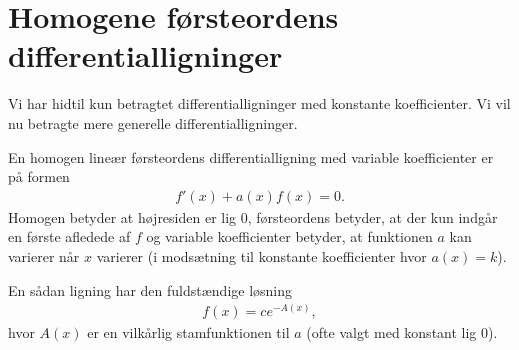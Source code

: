 \section{Homogene førsteordens differentialligninger}
\noindent Vi har hidtil kun betragtet differentialligninger med konstante koefficienter. Vi vil nu betragte mere generelle differentialligninger.

En homogen lineær førsteordens differentialligning med variable koefficienter er på formen 
\begin{align*}
f'(x) + a(x)f(x)=0.
\end{align*}
Homogen betyder at højresiden er lig $0$, førsteordens betyder, at der kun indgår en første afledede af $f$ og variable koefficienter betyder, at funktionen $a$ kan varierer når $x$ varierer (i modsætning til konstante koefficienter hvor $a(x)=k$).

En sådan ligning har den fuldstændige løsning 
\begin{align}\label{eq:diffeq3et}
f(x)=ce^{-A(x)},
\end{align}
hvor $A(x)$ er en vilkårlig stamfunktionen til $a$ (ofte valgt med konstant lig $0$).


